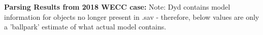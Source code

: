 \documentclass[12pt]{article}
\begin{document}
\textbf{Parsing Results from 2018 WECC case:}
Note: Dyd contains model information for objects no longer present in .sav - therefore, below values are only a 'ballpark' estimate of what actual model contains.





		
\end{document}
